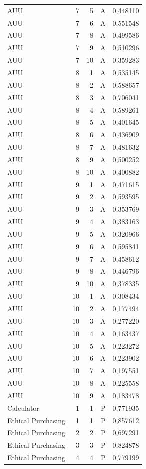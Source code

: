 \begin{longtable}{lrrrr}
AUU & 7 & 5 & A & 0,448110 \\
AUU & 7 & 6 & A & 0,551548 \\
AUU & 7 & 8 & A & 0,499586 \\
AUU & 7 & 9 & A & 0,510296 \\
AUU & 7 & 10 & A & 0,359283 \\
AUU & 8 & 1 & A & 0,535145 \\
AUU & 8 & 2 & A & 0,588657 \\
AUU & 8 & 3 & A & 0,706041 \\
AUU & 8 & 4 & A & 0,589261 \\
AUU & 8 & 5 & A & 0,401645 \\
AUU & 8 & 6 & A & 0,436909 \\
AUU & 8 & 7 & A & 0,481632 \\
AUU & 8 & 9 & A & 0,500252 \\
AUU & 8 & 10 & A & 0,400882 \\
AUU & 9 & 1 & A & 0,471615 \\
AUU & 9 & 2 & A & 0,593595 \\
AUU & 9 & 3 & A & 0,353769 \\
AUU & 9 & 4 & A & 0,383163 \\
AUU & 9 & 5 & A & 0,320966 \\
AUU & 9 & 6 & A & 0,595841 \\
AUU & 9 & 7 & A & 0,458612 \\
AUU & 9 & 8 & A & 0,446796 \\
AUU & 9 & 10 & A & 0,378335 \\
AUU & 10 & 1 & A & 0,308434 \\
AUU & 10 & 2 & A & 0,177494 \\
AUU & 10 & 3 & A & 0,277220 \\
AUU & 10 & 4 & A & 0,163437 \\
AUU & 10 & 5 & A & 0,223272 \\
AUU & 10 & 6 & A & 0,223902 \\
AUU & 10 & 7 & A & 0,197551 \\
AUU & 10 & 8 & A & 0,225558 \\
AUU & 10 & 9 & A & 0,183478 \\
Calculator & 1 & 1 & P & 0,771935 \\
Ethical Purchasing & 1 & 1 & P & 0,857612 \\
Ethical Purchasing & 2 & 2 & P & 0,697291 \\
Ethical Purchasing & 3 & 3 & P & 0,824878 \\
Ethical Purchasing & 4 & 4 & P & 0,779199 \\

\end{longtable}
